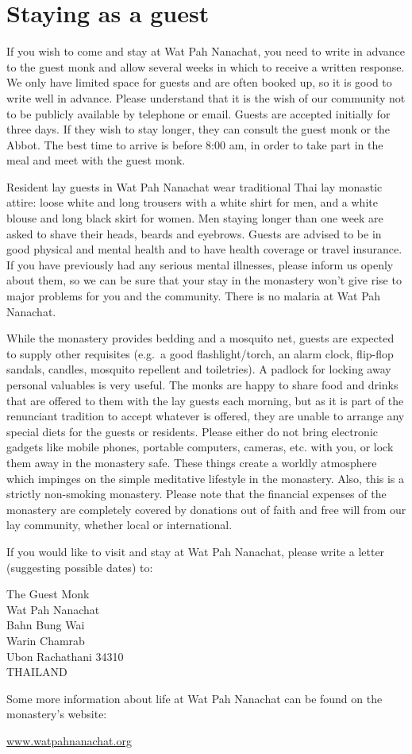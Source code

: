 \section{Staying as a guest}

If you wish to come and stay at Wat Pah Nanachat, you need to write in
advance to the guest monk and allow several weeks in which to receive a
written response. We only have limited space for guests and are often
booked up, so it is good to write well in advance. Please understand
that it is the wish of our community not to be publicly available by
telephone or email. Guests are accepted initially for three days. If
they wish to stay longer, they can consult the guest monk or the Abbot.
The best time to arrive is before 8:00 am, in order to take part in the
meal and meet with the guest monk.

Resident lay guests in Wat Pah Nanachat wear traditional Thai lay
monastic attire: loose white and long trousers with a white shirt for
men, and a white blouse and long black skirt for women. Men staying
longer than one week are asked to shave their heads, beards and
eyebrows. Guests are advised to be in good physical and mental health
and to have health coverage or travel insurance. If you have previously
had any serious mental illnesses, please inform us openly about them, so
we can be sure that your stay in the monastery won't give rise to major
problems for you and the community. There is no malaria at Wat Pah
Nanachat.

While the monastery provides bedding and a mosquito net, guests are
expected to supply other requisites (e.g.~a good flashlight/torch, an
alarm clock, flip-flop sandals, candles, mosquito repellent and
toiletries). A padlock for locking away personal valuables is very
useful. The monks are happy to share food and drinks that are offered to
them with the lay guests each morning, but as it is part of the
renunciant tradition to accept whatever is offered, they are unable to
arrange any special diets for the guests or residents. Please either do
not bring electronic gadgets like mobile phones, portable computers,
cameras, etc. with you, or lock them away in the monastery safe. These
things create a worldly atmosphere which impinges on the simple
meditative lifestyle in the monastery. Also, this is a strictly
non-smoking monastery. Please note that the financial expenses of the
monastery are completely covered by donations out of faith and free will
from our lay community, whether local or international.

\clearpage

If you would like to visit and stay at Wat Pah Nanachat, please write a
letter (suggesting possible dates) to:

The Guest Monk\\
Wat Pah Nanachat\\
Bahn Bung Wai\\
Warin Chamrab\\
Ubon Rachathani 34310\\
THAILAND

Some more information about life at Wat Pah Nanachat can be found on the
monastery's website:

\href{http://www.watpahnanachat.org/}{www.watpahnanachat.org}

